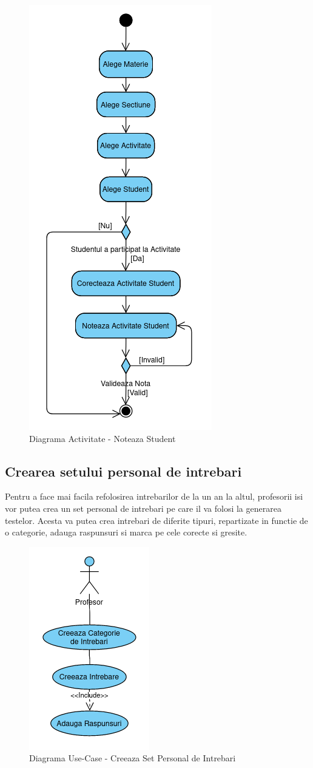 \documentclass[12pt, a4paper, oneside, romanian]{teza-upb}
\begin{document}
\begin{figure}[H]
\centering
\includegraphics*[width=0.45\columnwidth]{diagrama-activitate-noteaza-student}
\caption{Diagrama Activitate - Noteaza Student}
\label{diagrama-activitate-noteaza-student}
\end{figure}

\subsection{Crearea setului personal de intrebari}

Pentru a face mai facila refolosirea intrebarilor de la un an la altul, profesorii isi vor putea crea un set personal de intrebari pe care il va folosi la generarea testelor. Acesta va putea crea intrebari de diferite tipuri, repartizate in functie de o categorie, adauga raspunsuri si marca pe cele corecte si gresite.

\begin{figure}[H]
\centering
\includegraphics*[width=0.3\columnwidth]{diagrama-use-case-creeaza-set-personal-de-intrebari}
\caption{Diagrama Use-Case - Creeaza Set Personal de Intrebari}
\label{diagrama-use-case-creeaza-set-personal-de-intrebari}
\end{figure}
\end{document}
